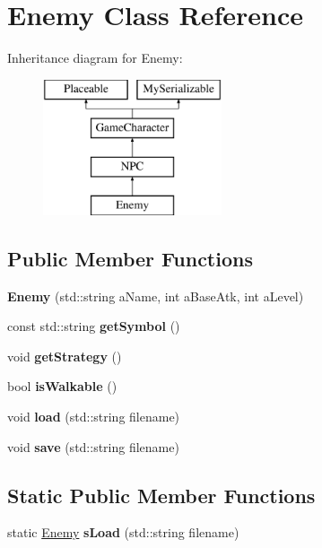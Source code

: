 \hypertarget{class_enemy}{}\section{Enemy Class Reference}
\label{class_enemy}
Inheritance diagram for Enemy\+:\begin{figure}[H]
\begin{center}
\leavevmode
\includegraphics[height=4.000000cm]{class_enemy}
\end{center}
\end{figure}
\subsection*{Public Member Functions}
\begin{DoxyCompactItemize}
\item 
\hypertarget{class_enemy_a864e90e43d37b9c4e55c3992100c435e}{}\label{class_enemy_a864e90e43d37b9c4e55c3992100c435e} 
{\bfseries Enemy} (std\+::string a\+Name, int a\+Base\+Atk, int a\+Level)
\item 
\hypertarget{class_enemy_afe96528d835454fc50d8290ea1158f34}{}\label{class_enemy_afe96528d835454fc50d8290ea1158f34} 
const std\+::string {\bfseries get\+Symbol} ()
\item 
\hypertarget{class_enemy_a16d7bdedccabfe8777d2d424a8dbe877}{}\label{class_enemy_a16d7bdedccabfe8777d2d424a8dbe877} 
void {\bfseries get\+Strategy} ()
\item 
\hypertarget{class_enemy_a34898829bc0fd2c0699f4bbe5ac8ed1a}{}\label{class_enemy_a34898829bc0fd2c0699f4bbe5ac8ed1a} 
bool {\bfseries is\+Walkable} ()
\item 
\hypertarget{class_enemy_ae025207363a769591c1accad3d1c2412}{}\label{class_enemy_ae025207363a769591c1accad3d1c2412} 
void {\bfseries load} (std\+::string filename)
\item 
\hypertarget{class_enemy_a186b6812f0fc859f1a67d02bb1a42a16}{}\label{class_enemy_a186b6812f0fc859f1a67d02bb1a42a16} 
void {\bfseries save} (std\+::string filename)
\end{DoxyCompactItemize}
\subsection*{Static Public Member Functions}
\begin{DoxyCompactItemize}
\item 
\hypertarget{class_enemy_a284a2d438cfa8e5de5fb796d351a04bb}{}\label{class_enemy_a284a2d438cfa8e5de5fb796d351a04bb} 
static \hyperlink{class_enemy}{Enemy} {\bfseries s\+Load} (std\+::string filename)
\end{DoxyCompactItemize}

